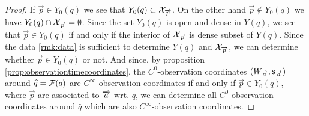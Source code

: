 \begin{proof}
    If $\overrightarrow{p}\in Y_0(q)$ we see that $Y_0(q) \subset \mc{X}_{\overrightarrow{p}}$. On the other hand $\overrightarrow{p}\notin Y_0(q)$ we have $Y_0(q) \cap \mc{X}_{\overrightarrow{p}} =\emptyset$. Since the set $Y_0(q)$ is open and dense in $Y(q)$, we see that $\overrightarrow{p}\in Y_0(q)$ if and only if the interior of $\mc{X}_{\overrightarrow{p}}$ is dense subset of $Y(q)$. Since the data \ref{rmk:data} is sufficient to determine $Y(q)$ and $\mc{X}_{\overrightarrow{p}}$, we can determine whether $\overrightarrow{p}\in Y_0(q)$ or not. And since, by proposition \ref{prop:observationtimecoordinates}, the $C^0$-observation coordinates $(W_\aa,\mathbf{s}_\aa)$ around $\widehat{q}=\F(q)$ are $C^\infty$-observation coordinates if and only if $\overrightarrow{p}\in Y_0(q)$, where $\overrightarrow{p}$ are associated to $\aa$ wrt. $q$, we can determine all $C^0$-observation coordinates around $\widehat{q}$ which are also $C^\infty$-observation coordinates.
\end{proof}


